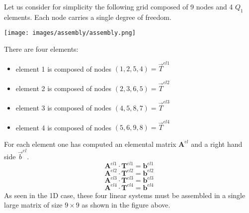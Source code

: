 Let us consider for simplicity the following grid composed of 9 nodes and 4 $Q_1$ elements. 
Each node carries a single degree of freedom. 

\begin{center}
\texttt{[image: images/assembly/assembly.png]} 
\end{center}

There are four elements:
\begin{itemize}
\item element 1 is composed of nodes $(1,2,5,4)={\vec T}^{el1}$
\item element 2 is composed of nodes $(2,3,6,5)={\vec T}^{el2}$
\item element 3 is composed of nodes $(4,5,8,7)={\vec T}^{el3}$
\item element 4 is composed of nodes $(5,6,9,8)={\vec T}^{el4}$
\end{itemize}
For each element one has computed an elemental matrix ${\bm A}^{el}$ and a right hand side ${\vec b}^{el}$. 
\[
{\bm A}^{el1} \cdot {\bm T}^{el1} = {\bm b}^{el1}
\]
\[
{\bm A}^{el2} \cdot {\bm T}^{el2} = {\bm b}^{el2}
\]
\[
{\bm A}^{el3} \cdot {\bm T}^{el3} = {\bm b}^{el3}
\]
\[
{\bm A}^{el4} \cdot {\bm T}^{el4} = {\bm b}^{el4}
\]
As seen in the 1D case, these four linear systems must be assembled in a single large matrix of size 
$9\times 9$ as shown in the figure above.

